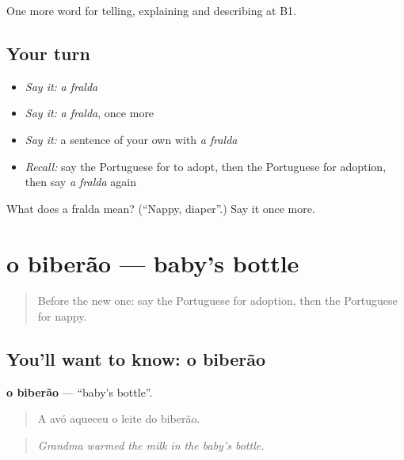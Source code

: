 \begin{grammarlens}[title={What you've built}]
One more word for telling, explaining and describing at B1.
\end{grammarlens}

\subsection*{Your turn}
\begin{itemize}
\raggedright
  \item \emph{Say it:} \emph{a fralda}
  \item \emph{Say it:} \emph{a fralda}, once more
  \item \emph{Say it:} a sentence of your own with \emph{a fralda}
  \item \emph{Recall:} say the Portuguese for to adopt, then the Portuguese for adoption, then say \emph{a fralda} again
\end{itemize}

\begin{tcolorbox}[breakable,colback=teal!4,colframe=teal!35!black,title={Before you move on}]
What does a fralda mean? (\textquotedblleft{}Nappy, diaper\textquotedblright{}.) Say it once more.
\end{tcolorbox}
\section[o biberão]{o biberão — baby's bottle}

\label{lesson:PT-C494-biberao}



\begin{quote}
Before the new one: say the Portuguese for adoption, then the Portuguese for nappy.
\end{quote}

\subsection*{You'll want to know: o biberão}
\textbf{o biberão} — \textquotedblleft{}baby's bottle\textquotedblright{}.

\begin{quote}
A avó aqueceu o leite do biberão.
\end{quote}

\begin{quote}
\emph{Grandma warmed the milk in the baby's bottle.}
\end{quote}

